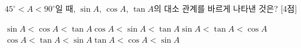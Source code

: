 $45^\circ<A<90^\circ$일 때, $\sin A$, $\cos A$, $\tan A$의 대소 관계를 바르게 나타낸 것은? \mbox{[4점]}
\begin{choicesv}{$\sin A<\cos A<\tan A$}{$\cos A<\sin A<\tan A$}{$\sin A<\tan A<\cos A$}{$\cos A<\tan A<\sin A$}{$\tan A<\cos A<\sin A$}\end{choicesv}
